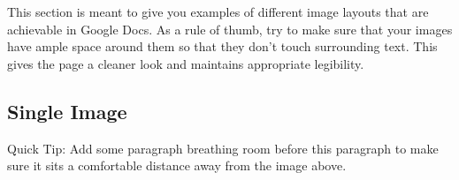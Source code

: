 \documentclass{nyu22report}
\begin{document}
This section is meant to give you examples of different image layouts that are
achievable in Google Docs. As a rule of thumb, try to make sure that your images
have ample space around them so that they don’t touch surrounding text. This
gives the page a cleaner look and maintains appropriate legibility.

\subsection*{Single Image}

Quick Tip: Add some paragraph breathing room before this paragraph to make sure
it sits a comfortable distance away from the image above. 
\end{document}
